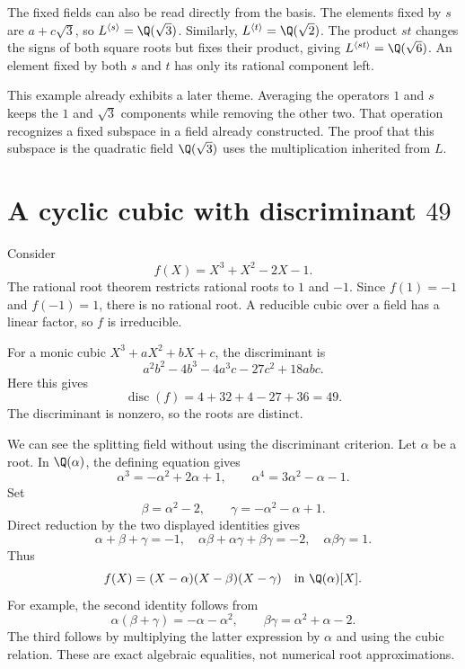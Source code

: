The fixed fields can also be read directly from the basis. The elements fixed by $s$ are $a+c\sqrt3$, so $L^{\langle s\rangle}=\Q(\sqrt3)$. Similarly, $L^{\langle t\rangle}=\Q(\sqrt2)$. The product $st$ changes the signs of both square roots but fixes their product, giving $L^{\langle st\rangle}=\Q(\sqrt6)$. An element fixed by both $s$ and $t$ has only its rational component left.

This example already exhibits a later theme. Averaging the operators $1$ and $s$ keeps the $1$ and $\sqrt3$ components while removing the other two. That operation recognizes a fixed subspace in a field already constructed. The proof that this subspace is the quadratic field $\Q(\sqrt3)$ uses the multiplication inherited from $L$.

\section{A cyclic cubic with discriminant $49$}

Consider
\[
f(X)=X^3+X^2-2X-1.
\]
The rational root theorem restricts rational roots to $1$ and $-1$. Since $f(1)=-1$ and $f(-1)=1$, there is no rational root. A reducible cubic over a field has a linear factor, so $f$ is irreducible.

For a monic cubic $X^3+aX^2+bX+c$, the discriminant is
\[
a^2b^2-4b^3-4a^3c-27c^2+18abc.
\]
Here this gives
\begin{equation}
\label{eq:g02-cubic-disc}
\operatorname{disc}(f)=4+32+4-27+36=49.
\end{equation}
The discriminant is nonzero, so the roots are distinct.

We can see the splitting field without using the discriminant criterion. Let $\alpha$ be a root. In $\Q(\alpha)$, the defining equation gives
\[
\alpha^3=-\alpha^2+2\alpha+1,
\qquad
\alpha^4=3\alpha^2-\alpha-1.
\]
Set
\[
\beta=\alpha^2-2,
\qquad
\gamma=-\alpha^2-\alpha+1.
\]
Direct reduction by the two displayed identities gives
\begin{equation}
\label{eq:g02-three-roots}
\alpha+\beta+\gamma=-1,
\quad
\alpha\beta+\alpha\gamma+\beta\gamma=-2,
\quad
\alpha\beta\gamma=1.
\end{equation}
Thus
\[
f(X)=(X-\alpha)(X-\beta)(X-\gamma)
\quad\text{in }\Q(\alpha)[X].
\]
For example, the second identity follows from
\[
\alpha(\beta+\gamma)=-\alpha-\alpha^2,
\qquad
\beta\gamma=\alpha^2+\alpha-2.
\]
The third follows by multiplying the latter expression by $\alpha$ and using the cubic relation. These are exact algebraic equalities, not numerical root approximations.

